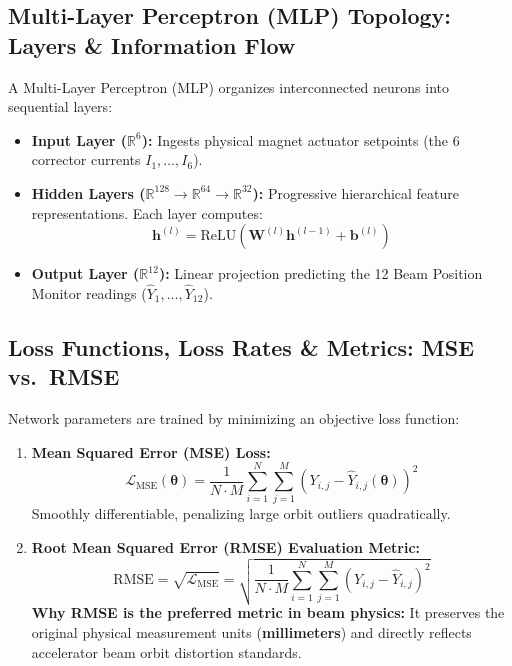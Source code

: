 \documentclass[11pt,a4paper]{article}
\begin{document}
\subsection{Multi-Layer Perceptron (MLP) Topology: Layers \& Information Flow}
A Multi-Layer Perceptron (MLP) organizes interconnected neurons into sequential layers:
\begin{itemize}
    \item \textbf{Input Layer ($\mathbb{R}^6$):} Ingests physical magnet actuator setpoints (the 6 corrector currents $I_1, \dots, I_6$).
    \item \textbf{Hidden Layers ($\mathbb{R}^{128} \rightarrow \mathbb{R}^{64} \rightarrow \mathbb{R}^{32}$):} Progressive hierarchical feature representations. Each layer computes:
    \begin{equation}
        \mathbf{h}^{(l)} = \text{ReLU}\left( \mathbf{W}^{(l)} \mathbf{h}^{(l-1)} + \mathbf{b}^{(l)} \right)
    \end{equation}
    \item \textbf{Output Layer ($\mathbb{R}^{12}$):} Linear projection predicting the 12 Beam Position Monitor readings ($\hat{Y}_1, \dots, \hat{Y}_{12}$).
\end{itemize}

\subsection{Loss Functions, Loss Rates \& Metrics: MSE vs.\ RMSE}
Network parameters are trained by minimizing an objective loss function:
\begin{enumerate}
    \item \textbf{Mean Squared Error (MSE) Loss:}
    \begin{equation}
        \mathcal{L}_{\text{MSE}}(\boldsymbol{\theta}) = \frac{1}{N \cdot M} \sum_{i=1}^N \sum_{j=1}^M \left( Y_{i,j} - \hat{Y}_{i,j}(\boldsymbol{\theta}) \right)^2
    \end{equation}
    Smoothly differentiable, penalizing large orbit outliers quadratically.
    
    \item \textbf{Root Mean Squared Error (RMSE) Evaluation Metric:}
    \begin{equation}
        \text{RMSE} = \sqrt{\mathcal{L}_{\text{MSE}}} = \sqrt{\frac{1}{N \cdot M} \sum_{i=1}^N \sum_{j=1}^M \left( Y_{i,j} - \hat{Y}_{i,j} \right)^2}
    \end{equation}
    \textbf{Why RMSE is the preferred metric in beam physics:} It preserves the original physical measurement units (\textbf{millimeters}) and directly reflects accelerator beam orbit distortion standards.
\end{enumerate}
\end{document}
